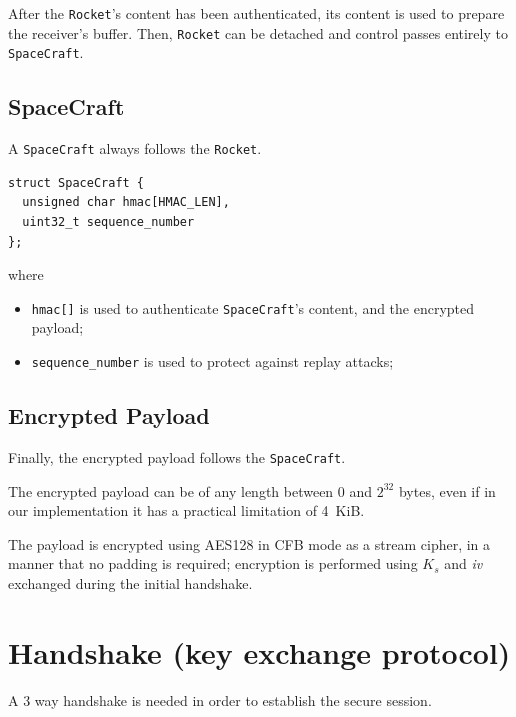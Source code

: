 \documentclass[a4paper,12pt]{article}
\begin{document}
After the \texttt{Rocket}'s content has been authenticated, its content is used to prepare the receiver's buffer.
Then, \texttt{Rocket} can be detached and control passes entirely to \texttt{SpaceCraft}.

\subsection{SpaceCraft}
A \texttt{SpaceCraft} always follows the \texttt{Rocket}.

\begin{verbatim}
struct SpaceCraft {
  unsigned char hmac[HMAC_LEN],
  uint32_t sequence_number
};
\end{verbatim}

where

\begin{itemize}
  \item \texttt{hmac[]} is used to authenticate \texttt{SpaceCraft}'s content, and the encrypted payload;
  \item \texttt{sequence\_number} is used to protect against replay attacks;
\end{itemize}

\subsection{Encrypted Payload}
Finally, the encrypted payload follows the \texttt{SpaceCraft}.

The encrypted payload can be of any length between $0$ and $2^{32}$ bytes, even if in our implementation it has a practical limitation of 4~KiB.

The payload is encrypted using AES128 in CFB mode as a stream cipher, in a manner that no padding is required;
encryption is performed using $K_s$ and \emph{iv} exchanged during the initial handshake.

\section{Handshake (key exchange protocol)}
A 3 way handshake is needed in order to establish the secure session.
\end{document}

